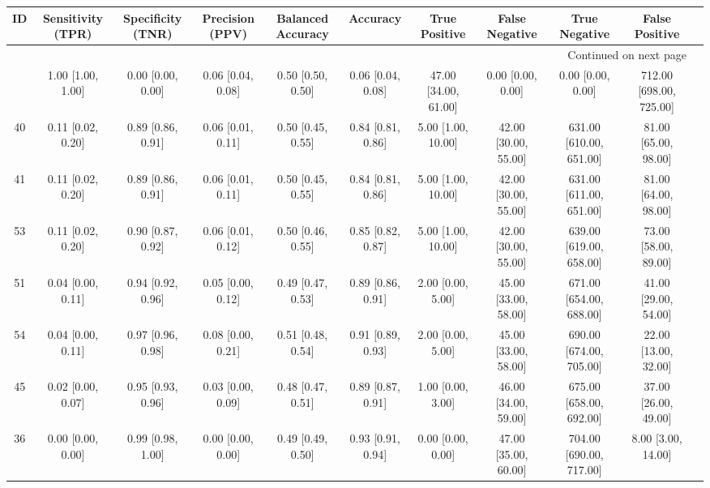 \documentclass[8pt]{article}
\begin{document}
\begin{center}
\begin{footnotesize}
\begin{longtable}{|ccccccccccc|}
\toprule
 ID &  Sensitivity (TPR) &  Specificity (TNR) &    Precision (PPV) &  Balanced Accuracy &           Accuracy &         True Positive &        False Negative &            True Negative &           False Positive \\
\midrule
\endhead
\midrule
\multicolumn{10}{r}{{Continued on next page}} \\
\midrule
\endfoot

\bottomrule
\endlastfoot
 42 &  1.00 [1.00, 1.00] &  0.00 [0.00, 0.00] &  0.06 [0.04, 0.08] &  0.50 [0.50, 0.50] &  0.06 [0.04, 0.08] &  47.00 [34.00, 61.00] &     0.00 [0.00, 0.00] &        0.00 [0.00, 0.00] &  712.00 [698.00, 725.00] \\
 40 &  0.11 [0.02, 0.20] &  0.89 [0.86, 0.91] &  0.06 [0.01, 0.11] &  0.50 [0.45, 0.55] &  0.84 [0.81, 0.86] &    5.00 [1.00, 10.00] &  42.00 [30.00, 55.00] &  631.00 [610.00, 651.00] &     81.00 [65.00, 98.00] \\
 41 &  0.11 [0.02, 0.20] &  0.89 [0.86, 0.91] &  0.06 [0.01, 0.11] &  0.50 [0.45, 0.55] &  0.84 [0.81, 0.86] &    5.00 [1.00, 10.00] &  42.00 [30.00, 55.00] &  631.00 [611.00, 651.00] &     81.00 [64.00, 98.00] \\
 53 &  0.11 [0.02, 0.20] &  0.90 [0.87, 0.92] &  0.06 [0.01, 0.12] &  0.50 [0.46, 0.55] &  0.85 [0.82, 0.87] &    5.00 [1.00, 10.00] &  42.00 [30.00, 55.00] &  639.00 [619.00, 658.00] &     73.00 [58.00, 89.00] \\
 51 &  0.04 [0.00, 0.11] &  0.94 [0.92, 0.96] &  0.05 [0.00, 0.12] &  0.49 [0.47, 0.53] &  0.89 [0.86, 0.91] &     2.00 [0.00, 5.00] &  45.00 [33.00, 58.00] &  671.00 [654.00, 688.00] &     41.00 [29.00, 54.00] \\
 54 &  0.04 [0.00, 0.11] &  0.97 [0.96, 0.98] &  0.08 [0.00, 0.21] &  0.51 [0.48, 0.54] &  0.91 [0.89, 0.93] &     2.00 [0.00, 5.00] &  45.00 [33.00, 58.00] &  690.00 [674.00, 705.00] &     22.00 [13.00, 32.00] \\
 45 &  0.02 [0.00, 0.07] &  0.95 [0.93, 0.96] &  0.03 [0.00, 0.09] &  0.48 [0.47, 0.51] &  0.89 [0.87, 0.91] &     1.00 [0.00, 3.00] &  46.00 [34.00, 59.00] &  675.00 [658.00, 692.00] &     37.00 [26.00, 49.00] \\
 36 &  0.00 [0.00, 0.00] &  0.99 [0.98, 1.00] &  0.00 [0.00, 0.00] &  0.49 [0.49, 0.50] &  0.93 [0.91, 0.94] &     0.00 [0.00, 0.00] &  47.00 [35.00, 60.00] &  704.00 [690.00, 717.00] &       8.00 [3.00, 14.00] \\

\end{longtable}
\end{footnotesize}
\end{center}
\end{document}
